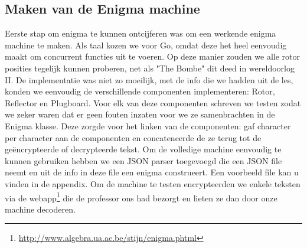 \subsection{Maken van de Enigma machine}
Eerste stap om enigma te kunnen ontcijferen was om een werkende enigma machine te maken. Als taal kozen we voor Go, omdat deze het heel eenvoudig maakt om concurrent functies uit te voeren. Op deze manier zouden we alle rotor posities tegelijk kunnen proberen, net als "The Bombe" dit deed in wereldoorlog II. De implementatie was niet zo moeilijk, met de info die we hadden uit de les, konden we eenvoudig de verschillende componenten implementeren: Rotor, Reflector en Plugboard. Voor elk van deze componenten schreven we testen zodat we zeker waren dat er geen fouten inzaten voor we ze samenbrachten in de Enigma klasse. Deze zorgde voor het linken van de componenten: gaf character per character aan de componenten en concateneerde de ze terug tot de ge\"encrypteerde of decrypteerde tekst. Om de volledige machine eenvoudig te kunnen gebruiken hebben we een JSON parser toegevoegd die een JSON file neemt en uit de info in deze file een enigma construeert. Een voorbeeld file kan u vinden in de appendix. Om de machine te testen encrypteerden we enkele teksten via de webapp\footnote{\url{http://www.algebra.ua.ac.be/stijn/enigma.phtml}} die de professor ons had bezorgt en lieten ze dan door onze machine decoderen.

